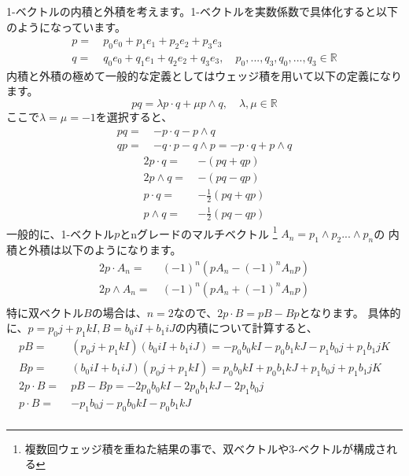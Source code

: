 \documentclass[a4paper,12pt,notitlepage]{jsreport}
\begin{document}
1-ベクトルの内積と外積を考えます。1-ベクトルを実数係数で具体化すると以下のようになっています。
\begin{equation}
  \begin{split}
    p = ~ & p_0 e_0 + p_1 e_1 + p_2 e_2 + p_3 e_3 \\
    q = ~ & q_0 e_0 + q_1 e_1 + q_2 e_2 + q_3 e_3 , \quad
    p_0 , ... , q_3 , q_0 , ... , q_3 \in \mathbb{R}
  \end{split}
\end{equation}
内積と外積の極めて一般的な定義としてはウェッジ積を用いて以下の定義になります。
\begin{equation}
  pq=\lambda p\cdot q+\mu p\wedge q,\quad \lambda,\mu\in\mathbb{R}
\end{equation}
ここで$\lambda=\mu=-1$を選択すると、
\begin{equation}
  \begin{split}
    pq=~&-p\cdot q-p\wedge q\\
    qp=~&-q\cdot p-q\wedge p=-p\cdot q+p\wedge q
  \end{split}
\end{equation}
\begin{equation}
  \begin{split}
    2p\cdot q=~&-(pq+qp)\\
    2p\wedge q=~&-(pq-qp)\\
    p \cdot q = ~ & - \frac{1}{2} (p q + q p) \\
    p \wedge q = ~ & - \frac{1}{2} (p q - q p)
  \end{split}
\end{equation}
一般的に、1-ベクトル$ p $とnグレードのマルチベクトル \footnote{複数回ウェッジ積を重ねた結果の事で、双ベクトルや3-ベクトルが構成される}
$ A_n = p_1 \wedge p_2 ... \wedge p_n $の
内積と外積は以下のようになります。
\begin{equation}
  \begin{split}
    2p \cdot A_n = ~ & (-1)^n (p A_n - (-1)^n A_n p) \\
    2p \wedge A_n = ~ & (-1)^n (p A_n + (-1)^n A_n p) \\
  \end{split}
\end{equation}
特に双ベクトル$ B $の場合は、$ n = 2 $なので、$ 2p \cdot B = p B - B p $となります。
具体的に、$ p = p_0 j + p_1 kI, B = b_0 iI + b_1 iJ $の内積について計算すると、
\begin{equation}
  \begin{split}
    pB = ~ & (p_0 j + p_1 kI)(b_0 iI + b_1 iJ) = - p_0 b_0 kI - p_0 b_1 kJ - p_1 b_0 j + p_1 b_1 jK \\
    Bp = ~ & (b_0 iI + b_1 iJ)(p_0 j + p_1 kI) = p_0 b_0 kI + p_0 b_1 kJ + p_1 b_0 j + p_1 b_1 jK \\
    2 p \cdot B = ~ & p B - B p = - 2 p_0 b_0 kI - 2 p_0 b_1 kJ - 2 p_1 b_0 j \\
    p \cdot B = ~ & - p_1 b_0 j - p_0 b_0 kI - p_0 b_1 kJ \\
  \end{split}
\end{equation}
\end{document}
